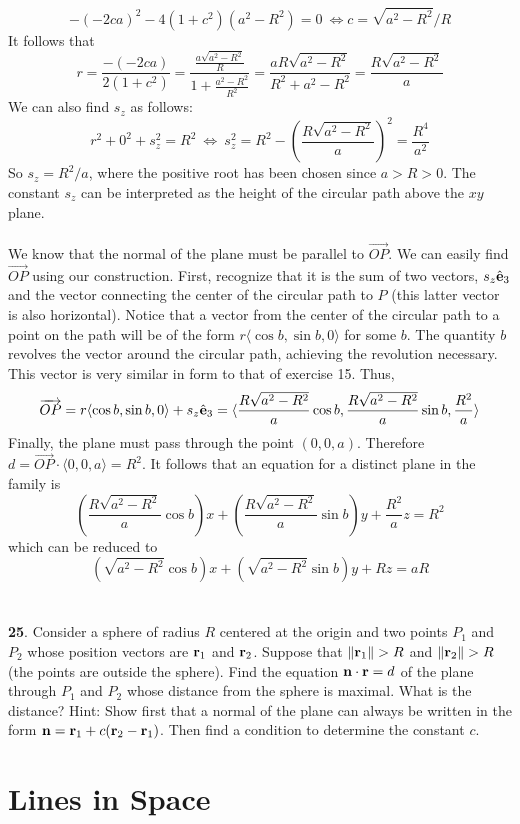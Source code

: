 \documentclass[12pt]{amsbook}
\newcommand{\la}{\langle}
\newcommand{\ra}{\rangle}
\begin{document}
$$-(-2ca)^2-4(1+c^2)(a^2-R^2)=0 \ \Leftrightarrow c=\sqrt{a^2-R^2}/R$$
It follows that 
$$r=\frac{-(-2ca)}{2(1+c^2)}=\frac{\frac{a\sqrt{a^2-R^2}}{R}}{1+\frac{a^2-R^2}{R^2}}=\frac{aR\sqrt{a^2-R^2}}{R^2+a^2-R^2}=\frac{R\sqrt{a^2-R^2}}{a}$$
We can also find $s_z$ as follows:
$$r^2+0^2+s_z^2=R^2 \ \Leftrightarrow \ s_z^2=R^2-(\frac{R\sqrt{a^2-R^2}}{a})^2=\frac{R^4}{a^2}$$
So $s_z=R^2/a$, where the positive root has been chosen since $a>R>0$. The constant $s_z$ can be interpreted as the height of the circular path above the $xy$ plane.
\\
\\
We know that the normal of the plane must be parallel to $\overrightarrow{OP}$. We can easily find $\overrightarrow{OP}$ using our construction. First, recognize that it is the sum of two vectors, $s_z\hat{\bf e}_3$ and the vector connecting the center of the circular path to $P$ (this latter vector is also horizontal). Notice that a vector from the center of the circular path to a point on the path will be of the form $r\la \cos b, \sin b,0\ra$ for some $b$. The quantity $b$ revolves the vector around the circular path, achieving the revolution necessary. This vector is very similar in form to that of exercise 15. Thus, 
$$\overrightarrow{OP}=r\la \cos b,\sin b, 0\ra + s_z\hat{\bf e}_3=\la \frac{R\sqrt{a^2-R^2}}{a}\cos b, \frac{R\sqrt{a^2-R^2}}{a}\sin b, \frac{R^2}{a}\ra $$
Finally, the plane must pass through the point $(0,0,a)$. Therefore $d=\overrightarrow{OP}\cdot\la 0,0,a\ra=R^2$. It follows that an equation for a distinct plane in the family is
$$(\frac{R\sqrt{a^2-R^2}}{a}\cos b)x+(\frac{R\sqrt{a^2-R^2}}{a}\sin b)y+\frac{R^2}{a}z=R^2 $$ which can be reduced to
$$(\sqrt{a^2-R^2}\cos b)x+(\sqrt{a^2-R^2}\sin b)y+Rz=aR$$
\\
\\
{\small\bf 25}. Consider a sphere of radius $R$ centered 
at the origin and two points $P_1$ and $P_2$
whose position vectors  are ${\bf r}_1$ and ${\bf r}_2$. 
Suppose that $\|{\bf r}_1\|>R$ and $\|{\bf r}_2\|>R$
(the points are outside the sphere). Find the equation 
${\bf n}\cdot{\bf r}=d$
of the plane through $P_1$ and $P_2$ whose distance 
from the sphere is maximal. What is the distance?
Hint: Show first that 
a normal of the plane can always be written in the 
form ${\bf n}={\bf r}_1+c({\bf r}_2-{\bf r}_1)$. Then find a condition 
to determine the constant $c$.

\newpage
\section{Lines in Space}
\end{document}
